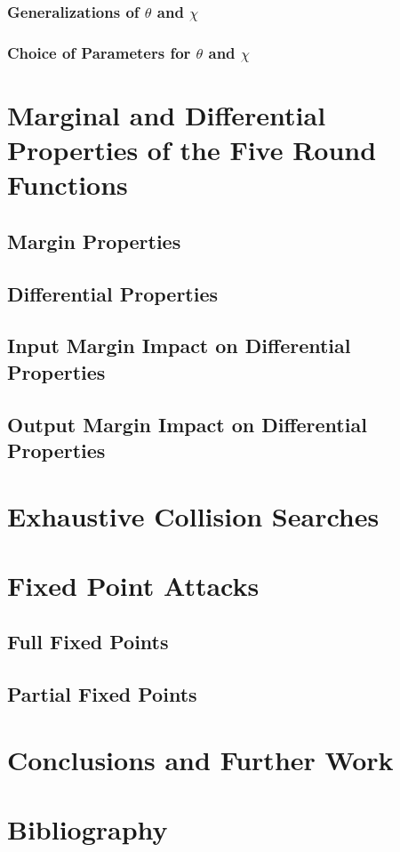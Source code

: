 \documentclass[10pt,twocolumn,twoside]{pnas-new}
\begin{document}
\subsubsection{Generalizations of $\theta$ and $\chi$} \label{sec:p:generalizations}

\subsubsection{Choice of Parameters for $\theta$ and $\chi$} \label{sec:p:generalizations}




\section{Marginal and Differential Properties of the Five Round Functions} \label{sec:differentials}

\subsection{Margin Properties} \label{sec:d:margin}

\subsection{Differential Properties} \label{sec:d:diff}

\subsection{Input Margin Impact on Differential Properties} \label{sec:d:input}

\subsection{Output Margin Impact on Differential Properties} \label{sec:d:output}




\section{Exhaustive Collision Searches} \label{sec:search}

\section{Fixed Point Attacks} \label{sec:fixed}

\subsection{Full Fixed Points} \label{sec:f:full}

\subsection{Partial Fixed Points} \label{sec:f:partial}




\section{Conclusions and Further Work} \label{sec:conclusion}

\section{Bibliography} \label{sec:bibliography}


\end{document}
